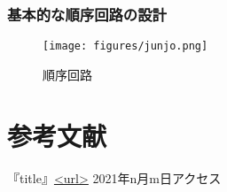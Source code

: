 \documentclass{ltjsarticle}
\begin{document}
\subsubsection{基本的な順序回路の設計}
\begin{figure}[H]
    \begin{center}
        \texttt{[image: figures/junjo.png]}
        \caption{順序回路}
    \end{center}
\end{figure}

\section{参考文献}
『title』\url{<url>} 2021年n月m日アクセス
\end{document}
